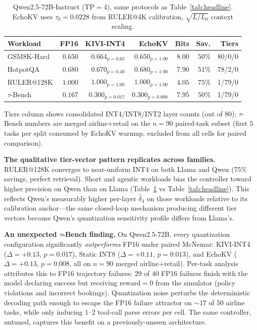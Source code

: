 \documentclass{article}
\begin{document}
\begin{table}[h]
\centering
\caption{Qwen2.5-72B-Instruct (TP$=$4), same protocols as
  Table~\ref{tab:headline}. EchoKV uses $\tau_0{=}0.0228$ from RULER@4K
  calibration, $\sqrt{L/L_0}$ context scaling.}
\label{tab:qwen_headline}
\footnotesize
\setlength{\tabcolsep}{4pt}
\begin{tabular}{lrrrrrr}
\toprule
Workload     & FP16    & KIVI-INT4         & EchoKV                     & Bits & Sav. & Tiers \\
\midrule
GSM8K-Hard   & $0.650$ & $0.664_{p=0.65}$  & $\mathbf{0.650}_{p=1.00}$  & $8.00$ & $50\%$ & 80/0/0 \\
HotpotQA     & $0.680$ & $0.670_{p=0.40}$  & $\mathbf{0.680}_{p=1.00}$  & $7.90$ & $51\%$ & 78/2/0 \\
RULER@128K   & $1.000$ & $1.000_{p=1.00}$  & $\mathbf{1.000}_{p=1.00}$  & $4.05$ & $75\%$ & 1/79/0 \\
$\tau$-Bench & $0.167$ & $0.300_{p=0.017}$ & $\mathbf{0.300}_{p=0.008}$ & $7.95$ & $50\%$ & 1/79/0 \\
\bottomrule
\end{tabular}
\par\smallskip
{\footnotesize Tiers column shows consolidated INT4/INT8/INT2 layer counts (out of $80$); $\tau$-Bench numbers are merged airline+retail on the $n{=}90$ paired-task subset (first $5$ tasks per split consumed by EchoKV warmup, excluded from all cells for paired comparison).\par}
\end{table}

\textbf{The qualitative tier-vector pattern replicates across families.}
RULER@128K converges to near-uniform INT4 on both Llama and Qwen
($75\%$ savings, perfect retrieval). Short and agentic workloads bias
the controller toward higher precision on Qwen than on Llama
(Table~\ref{tab:qwen_headline} vs Table~\ref{tab:headline}). This
reflects Qwen's measurably higher per-layer $\hat{\delta}_4$ on those
workloads relative to its calibration anchor---the same closed-loop
mechanism producing different tier vectors because Qwen's quantization
sensitivity profile differs from Llama's.

\textbf{An unexpected $\tau$-Bench finding.} On Qwen2.5-72B, every
quantization configuration significantly \emph{outperforms} FP16 under
paired McNemar: KIVI-INT4 ($\Delta{=}{+}0.13$, $p{=}0.017$), Static INT8
($\Delta{=}{+}0.11$, $p{=}0.013$), and EchoKV
($\Delta{=}{+}0.13$, $p{=}0.008$, all on $n{=}90$ merged
airline+retail). Per-task analysis attributes this to FP16 trajectory
failures: $29$ of $40$ FP16 failures finish with the model declaring
success but receiving $\text{reward}{=}0$ from the simulator (policy
violations and incorrect bookings). Quantization noise perturbs
the deterministic decoding path enough to escape the FP16 failure
attractor on $\sim$$17$ of $50$ airline tasks, while only inducing
$1$--$2$ tool-call parse errors per cell. The same controller, untuned,
captures this benefit on a previously-unseen architecture.
\end{document}
